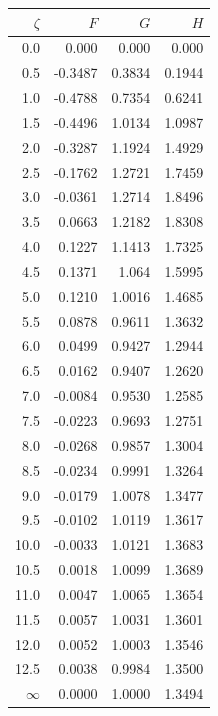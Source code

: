 \documentclass[twocolumn,a4j]{jsarticle}
\begin{document}
\begin{table}[hbtp]
  \centering
  \begin{tabular}{| r | r | r | r |}
    \hline
    $\zeta$  & $F$     & $G$    & $H$    \\ \hline \hline
    0.0      & 0.000   & 0.000  & 0.000  \\ \hline
    0.5      & -0.3487 & 0.3834 & 0.1944 \\ \hline
    1.0      & -0.4788 & 0.7354 & 0.6241 \\ \hline
    1.5      & -0.4496 & 1.0134 & 1.0987 \\ \hline
    2.0      & -0.3287 & 1.1924 & 1.4929 \\ \hline
    2.5      & -0.1762 & 1.2721 & 1.7459 \\ \hline
    3.0      & -0.0361 & 1.2714 & 1.8496 \\ \hline
    3.5      & 0.0663  & 1.2182 & 1.8308 \\ \hline
    4.0      & 0.1227  & 1.1413 & 1.7325 \\ \hline
    4.5      & 0.1371  & 1.064  & 1.5995 \\ \hline
    5.0      & 0.1210  & 1.0016 & 1.4685 \\ \hline
    5.5      & 0.0878  & 0.9611 & 1.3632 \\ \hline
    6.0      & 0.0499  & 0.9427 & 1.2944 \\ \hline
    6.5      & 0.0162  & 0.9407 & 1.2620 \\ \hline
    7.0      & -0.0084 & 0.9530 & 1.2585 \\ \hline
    7.5      & -0.0223 & 0.9693 & 1.2751 \\ \hline
    8.0      & -0.0268 & 0.9857 & 1.3004 \\ \hline
    8.5      & -0.0234 & 0.9991 & 1.3264 \\ \hline
    9.0      & -0.0179 & 1.0078 & 1.3477 \\ \hline
    9.5      & -0.0102 & 1.0119 & 1.3617 \\ \hline
    10.0     & -0.0033 & 1.0121 & 1.3683 \\ \hline
    10.5     & 0.0018  & 1.0099 & 1.3689 \\ \hline
    11.0     & 0.0047  & 1.0065 & 1.3654 \\ \hline
    11.5     & 0.0057  & 1.0031 & 1.3601 \\ \hline
    12.0     & 0.0052  & 1.0003 & 1.3546 \\ \hline
    12.5     & 0.0038  & 0.9984 & 1.3500 \\ \hline
    $\infty$ & 0.0000  & 1.0000 & 1.3494 \\ \hline
  \end{tabular}
\end{table}
\end{document}
